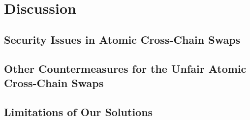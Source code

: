 \section{Discussion}
\label{sec:discussion}

\subsection{Security Issues in Atomic Cross-Chain Swaps}

\subsection{Other Countermeasures for the Unfair Atomic Cross-Chain Swaps}

\subsection{Limitations of Our Solutions}
